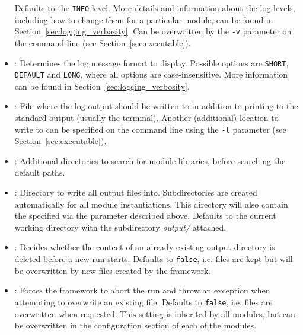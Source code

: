 \begin{itemize}
Defaults to the \texttt{INFO} level.
More details and information about the log levels, including how to change them for a particular module, can be found in Section~\ref{sec:logging_verbosity}.
Can be overwritten by the \texttt{-v} parameter on the command line (see Section~\ref{sec:executable}).
\item {}: Determines the log message format to display.
Possible options are \texttt{SHORT}, \texttt{DEFAULT} and \texttt{LONG}, where all options are case-insensitive.
More information can be found in Section~\ref{sec:logging_verbosity}.
\item {}: File where the log output should be written to in addition to printing to the standard output (usually the terminal).
Another (additional) location to write to can be specified on the command line using the \texttt{-l} parameter (see Section~\ref{sec:executable}).
\item {}: Additional directories to search for module libraries, before searching the default paths.
\item {}: Directory to write all output files into.
Subdirectories are created automatically for all module instantiations.
This directory will also contain the  specified via the parameter described above.
Defaults to the current working directory with the subdirectory \textit{output/} attached.
\item {}: Decides whether the content of an already existing output directory is deleted before a new run starts. Defaults to \texttt{false}, i.e. files are kept but will be overwritten by new files created by the framework.
\item {}: Forces the framework to abort the run and throw an exception when attempting to overwrite an existing file. Defaults to \texttt{false}, i.e. files are overwritten when requested. This setting is inherited by all modules, but can be overwritten in the configuration section of each of the modules.
\end{itemize}

